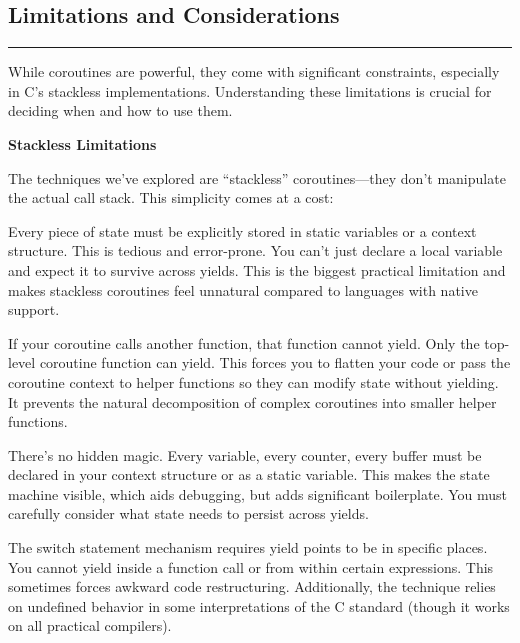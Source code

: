 \vspace{0.5cm}
\subsection{Limitations and Considerations}

\noindent\rule{\textwidth}{0.4pt}
\vspace{0.2cm}

While coroutines are powerful, they come with significant constraints, especially in C's stackless implementations. Understanding these limitations is crucial for deciding when and how to use them.

\vspace{0.3cm}
\noindent\textbf{\large Stackless Limitations}

\vspace{0.2cm}
\noindent The techniques we've explored are ``stackless'' coroutines---they don't manipulate the actual call stack. This simplicity comes at a cost:

\begin{description}[style=nextline,leftmargin=0pt]
    \item[\textbf{Cannot preserve local variables automatically}] Every piece of state must be explicitly stored in static variables or a context structure. This is tedious and error-prone. You can't just declare a local variable and expect it to survive across yields. This is the biggest practical limitation and makes stackless coroutines feel unnatural compared to languages with native support.

    \item[\textbf{Cannot yield from nested function calls}] If your coroutine calls another function, that function cannot yield. Only the top-level coroutine function can yield. This forces you to flatten your code or pass the coroutine context to helper functions so they can modify state without yielding. It prevents the natural decomposition of complex coroutines into smaller helper functions.

    \item[\textbf{All state must be explicit}] There's no hidden magic. Every variable, every counter, every buffer must be declared in your context structure or as a static variable. This makes the state machine visible, which aids debugging, but adds significant boilerplate. You must carefully consider what state needs to persist across yields.

    \item[\textbf{Switch-based approach limits where yields can occur}] The switch statement mechanism requires yield points to be in specific places. You cannot yield inside a function call or from within certain expressions. This sometimes forces awkward code restructuring. Additionally, the technique relies on undefined behavior in some interpretations of the C standard (though it works on all practical compilers).
\end{description}

